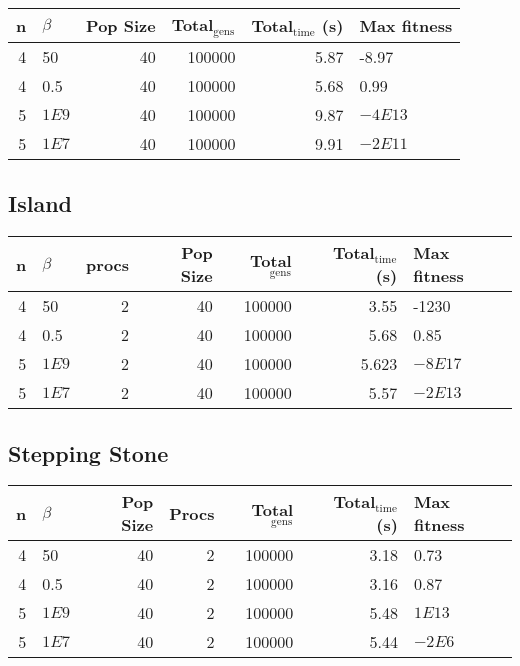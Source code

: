 \documentclass[11pt]{article}
\begin{document}
\begin{center}
\begin{tabular}{rlrrrl}
n & \(\beta\) & Pop Size & Total\(_{\text{gens}}\) & Total\(_{\text{time}}\) (s) & Max fitness\\
\hline
4 & 50 & 40 & 100000 & 5.87 & -8.97\\
4 & 0.5 & 40 & 100000 & 5.68 & 0.99\\
5 & \(1E9\) & 40 & 100000 & 9.87 & \(-4E13\)\\
5 & \(1E7\) & 40 & 100000 & 9.91 & \(-2E11\)\\
\end{tabular}
\end{center}

\subsection{Island}
\label{sec:orgbe9572b}

\begin{center}
\begin{tabular}{rlrrrrl}
n & \(\beta\) & procs & Pop Size & Total\(_{\text{gens}}\) & Total\(_{\text{time}}\) (s) & Max fitness\\
\hline
4 & 50 & 2 & 40 & 100000 & 3.55 & -1230\\
4 & 0.5 & 2 & 40 & 100000 & 5.68 & 0.85\\
5 & \(1E9\) & 2 & 40 & 100000 & 5.623 & \(-8E17\)\\
5 & \(1E7\) & 2 & 40 & 100000 & 5.57 & \(-2E13\)\\
\end{tabular}
\end{center}

\subsection{Stepping Stone}
\label{sec:org906bf75}


\begin{center}
\begin{tabular}{rlrrrrl}
n & \(\beta\) & Pop Size & Procs & Total\(_{\text{gens}}\) & Total\(_{\text{time}}\) (s) & Max fitness\\
\hline
4 & 50 & 40 & 2 & 100000 & 3.18 & 0.73\\
4 & 0.5 & 40 & 2 & 100000 & 3.16 & 0.87\\
5 & \(1E9\) & 40 & 2 & 100000 & 5.48 & \(1E13\)\\
5 & \(1E7\) & 40 & 2 & 100000 & 5.44 & \(-2E6\)\\
\end{tabular}
\end{center}
\end{document}
